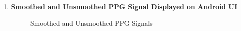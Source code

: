\documentclass[12pt]{article}
\begin{document}
\begin{enumerate}

\item \textbf{Smoothed and Unsmoothed PPG Signal Displayed on Android UI}

\begin{figure}[!htb]
  \centering
  \quad\quad
  \caption{Smoothed and Unsmoothed PPG Signals}
\end{figure}





\end{enumerate}
\end{document}
